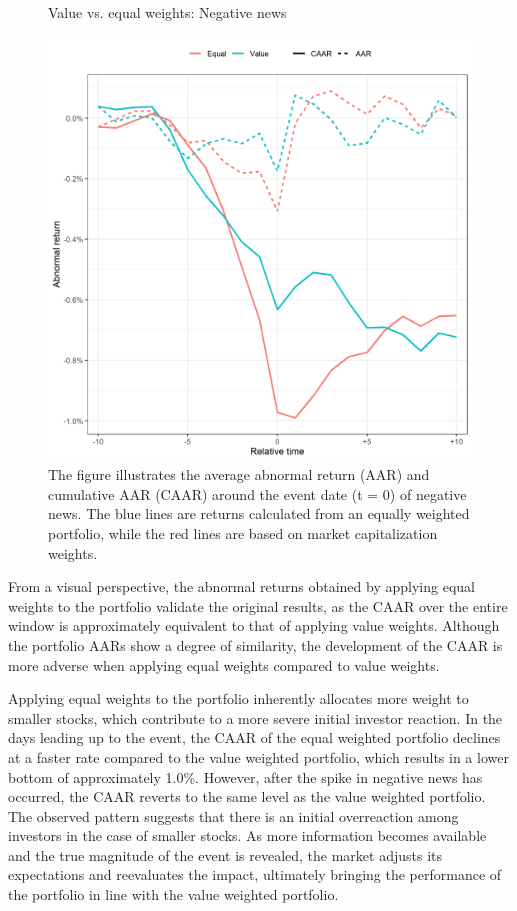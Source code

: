 \begin{figure}[h]
    \centering
    \caption{Value vs. equal weights: Negative news }
    \includegraphics[scale=0.6]{Projekt/1.Figures analysis/ST_negative_sensitivity_weight.png}
     \caption*{\footnotesize The figure illustrates the average abnormal return (AAR) and cumulative AAR (CAAR) around the event date (t = 0) of negative news. The blue lines are returns calculated from an equally weighted portfolio, while the red lines are based on market capitalization weights.}
    \label{fig:ST_neg_sensitivity_weight}
\end{figure} 

From a visual perspective, the abnormal returns obtained by applying equal weights to the portfolio validate the original results, as the CAAR over the entire window is approximately equivalent to that of applying value weights. Although the portfolio AARs show a degree of similarity, the development of the CAAR is more adverse when applying equal weights compared to value weights. 

Applying equal weights to the portfolio inherently allocates more weight to smaller stocks, which contribute to a more severe initial investor reaction. In the days leading up to the event, the CAAR of the equal weighted portfolio declines at a faster rate compared to the value weighted portfolio, which results in a lower bottom of approximately 1.0\%. However, after the spike in negative news has occurred, the CAAR reverts to the same level as the value weighted portfolio. The observed pattern suggests that there is an initial overreaction among investors in the case of smaller stocks. As more information becomes available and the true magnitude of the event is revealed, the market adjusts its expectations and reevaluates the impact, ultimately bringing the performance of the portfolio in line with the value weighted portfolio.

